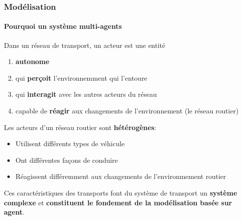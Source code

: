 \begin{frame}
    \frametitle{Modélisation}
    \framesubtitle{Pourquoi un système multi-agents}

    Dans un réseau de transport, un acteur est une entité
    \begin{enumerate}
        \item \textbf{autonome}
        \item qui \textbf{perçoit} l'environnemment qui l'entoure
        \item qui \textbf{interagit} avec les autres acteurs du réseau
        \item capable de \textbf{réagir} aux changements de l'environnement (le réseau routier)
    \end{enumerate}

    \pause{}
    Les acteurs d'un réseau routier sont \textbf{hétérogènes}:

    \begin{itemize}
        \item Utilisent différents types de véhicule
        \item Ont différentes façons de conduire
        \item Réagissent différemment aux changements de l'environmement routier
    \end{itemize}

    \pause{}
    Ces caractéristiques des transports font du système de transport un \textbf{système complexe} et \textbf{constituent le fondement de la modélisation basée sur agent}.
\end{frame}


